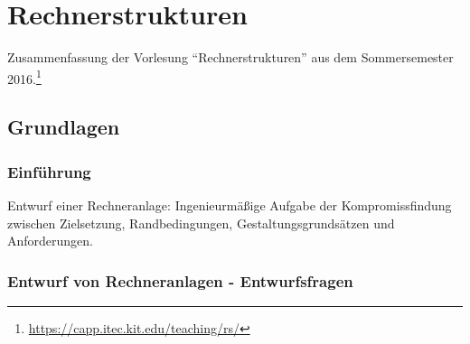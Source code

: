 \chapter{Rechnerstrukturen}

Zusammenfassung der Vorlesung "`Rechnerstrukturen"' aus dem Sommersemester 2016.\footnote{\url{https://capp.itec.kit.edu/teaching/rs/}}

\section{Grundlagen}

\subsection{Einführung}
Entwurf einer Rechneranlage: Ingenieurmäßige Aufgabe der Kompromissfindung zwischen Zielsetzung, Randbedingungen, Gestaltungsgrundsätzen und Anforderungen.


\subsection{Entwurf von Rechneranlagen - Entwurfsfragen}

